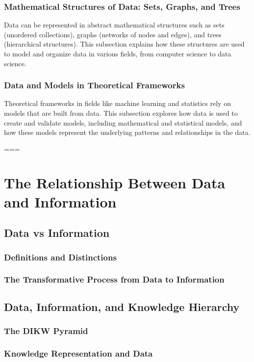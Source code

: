 \documentclass[12pt, oneside]{book}
\begin{document}
\subsubsection{Mathematical Structures of Data: Sets, Graphs, and Trees}
Data can be represented in abstract mathematical structures such as sets (unordered collections), graphs (networks of nodes and edges), and trees (hierarchical structures). This subsection explains how these structures are used to model and organize data in various fields, from computer science to data science.

\subsubsection{Data and Models in Theoretical Frameworks}
Theoretical frameworks in fields like machine learning and statistics rely on models that are built from data. This subsection explores how data is used to create and validate models, including mathematical and statistical models, and how these models represent the underlying patterns and relationships in the data.

===

\section{The Relationship Between Data and Information}
\subsection{Data vs Information}
\subsubsection{Definitions and Distinctions}
\subsubsection{The Transformative Process from Data to Information}
\subsection{Data, Information, and Knowledge Hierarchy}
\subsubsection{The DIKW Pyramid}
\subsubsection{Knowledge Representation and Data}
\end{document}
